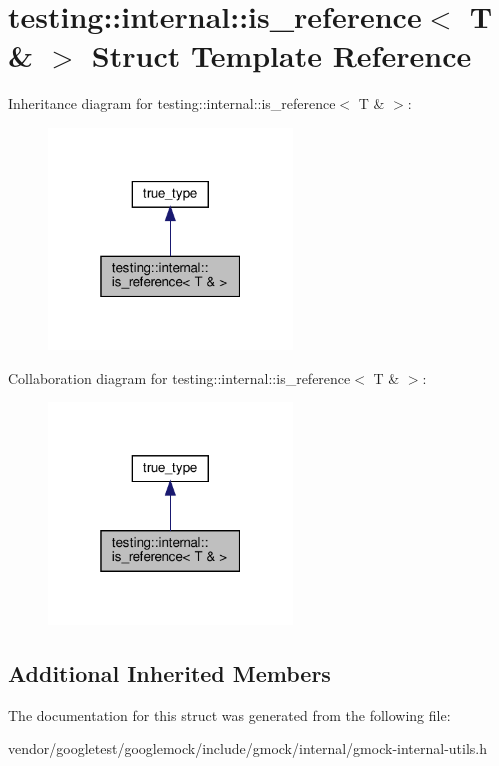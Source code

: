 \hypertarget{structtesting_1_1internal_1_1is__reference_3_01_t_01_6_01_4}{}\section{testing\+:\+:internal\+:\+:is\+\_\+reference$<$ T \& $>$ Struct Template Reference}
\label{structtesting_1_1internal_1_1is__reference_3_01_t_01_6_01_4}


Inheritance diagram for testing\+:\+:internal\+:\+:is\+\_\+reference$<$ T \& $>$\+:
\nopagebreak
\begin{figure}[H]
\begin{center}
\leavevmode
\includegraphics[width=184pt]{structtesting_1_1internal_1_1is__reference_3_01_t_01_6_01_4__inherit__graph}
\end{center}
\end{figure}


Collaboration diagram for testing\+:\+:internal\+:\+:is\+\_\+reference$<$ T \& $>$\+:
\nopagebreak
\begin{figure}[H]
\begin{center}
\leavevmode
\includegraphics[width=184pt]{structtesting_1_1internal_1_1is__reference_3_01_t_01_6_01_4__coll__graph}
\end{center}
\end{figure}
\subsection*{Additional Inherited Members}


The documentation for this struct was generated from the following file\+:\begin{DoxyCompactItemize}
\item 
vendor/googletest/googlemock/include/gmock/internal/gmock-\/internal-\/utils.\+h\end{DoxyCompactItemize}
